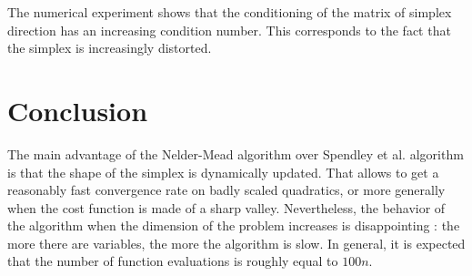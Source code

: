 The numerical experiment shows that the conditioning of the matrix 
of simplex direction has an increasing condition number. This corresponds to the 
fact that the simplex is increasingly distorted.

\section{Conclusion}

The main advantage of the Nelder-Mead algorithm over Spendley et al.
algorithm is that the shape of the simplex is dynamically updated.
That allows to get a reasonably fast convergence rate on badly scaled
quadratics, or more generally when the cost function is made 
of a sharp valley. Nevertheless, the behavior of the algorithm when the 
dimension of the problem increases is disappointing : the more there are 
variables, the more the algorithm is slow. In general, it is expected 
that the number of function evaluations is roughly equal to $100n$.

